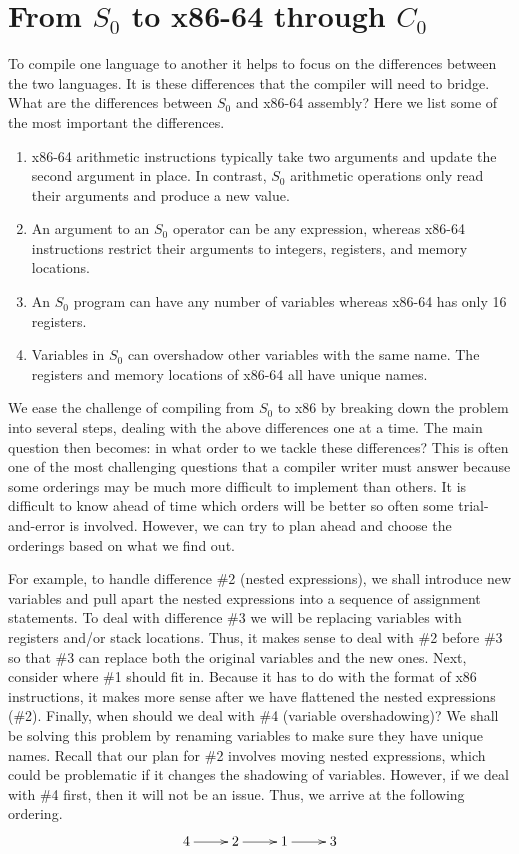 \documentclass[12pt]{book}
\begin{document}
\section{From $S_0$ to x86-64 through $C_0$}
\label{sec:plan-s0-x86}

To compile one language to another it helps to focus on the
differences between the two languages. It is these differences that
the compiler will need to bridge. What are the differences between
$S_0$ and x86-64 assembly? Here we list some of the most important the
differences.

\begin{enumerate}
\item x86-64 arithmetic instructions typically take two arguments and
  update the second argument in place. In contrast, $S_0$ arithmetic
  operations only read their arguments and produce a new value.

\item An argument to an $S_0$ operator can be any expression, whereas
  x86-64 instructions restrict their arguments to integers, registers,
  and memory locations.

\item An $S_0$ program can have any number of variables whereas x86-64
  has only 16 registers.

\item Variables in $S_0$ can overshadow other variables with the same
  name. The registers and memory locations of x86-64 all have unique
  names.
\end{enumerate}

We ease the challenge of compiling from $S_0$ to x86 by breaking down
the problem into several steps, dealing with the above differences one
at a time. The main question then becomes: in what order to we tackle
these differences? This is often one of the most challenging questions
that a compiler writer must answer because some orderings may be much
more difficult to implement than others. It is difficult to know ahead
of time which orders will be better so often some trial-and-error is
involved. However, we can try to plan ahead and choose the orderings
based on what we find out.

For example, to handle difference \#2 (nested expressions), we shall
introduce new variables and pull apart the nested expressions into a
sequence of assignment statements.  To deal with difference \#3 we
will be replacing variables with registers and/or stack
locations. Thus, it makes sense to deal with \#2 before \#3 so that
\#3 can replace both the original variables and the new ones. Next,
consider where \#1 should fit in. Because it has to do with the format
of x86 instructions, it makes more sense after we have flattened the
nested expressions (\#2). Finally, when should we deal with \#4
(variable overshadowing)?  We shall be solving this problem by
renaming variables to make sure they have unique names. Recall that
our plan for \#2 involves moving nested expressions, which could be
problematic if it changes the shadowing of variables. However, if we
deal with \#4 first, then it will not be an issue.  Thus, we arrive at
the following ordering.
\[
\xymatrix{
4 \ar[r] & 2 \ar[r] & 1 \ar[r] & 3
}
\]
\end{document}
